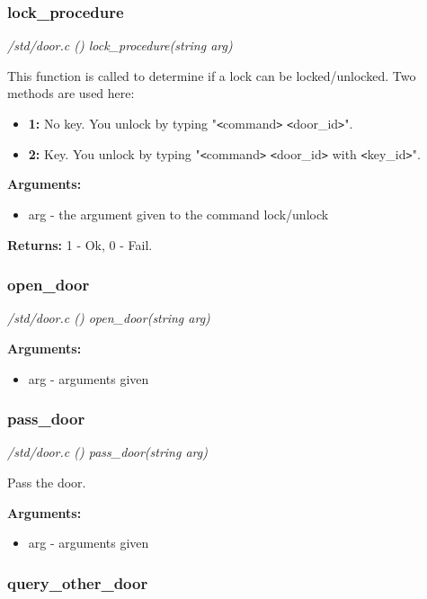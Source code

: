 \subsubsection{lock\_procedure}

{\em /std/door.c () lock\_procedure(string arg)}

This function is called to determine if
a lock can be locked/unlocked.
Two methods are used here:
\begin{itemize}
\item{\bf 1:} No key. You unlock by typing "\verb+<+command\verb+>+ \verb+<+door\_id\verb+>+".
\item{\bf 2:} Key. You unlock by typing "\verb+<+command\verb+>+ \verb+<+door\_id\verb+>+ with \verb+<+key\_id\verb+>+".
\end{itemize}

{\bf Arguments:}
\begin{itemize}
\item     arg - the argument given to the command lock/unlock
\end{itemize}

{\bf Returns:}        1 - Ok, 0 - Fail.


\subsubsection{open\_door}

{\em /std/door.c () open\_door(string arg)}


{\bf Arguments:}
\begin{itemize}
\item     arg - arguments given
\end{itemize}


\subsubsection{pass\_door}

{\em /std/door.c () pass\_door(string arg)}

Pass the door.

{\bf Arguments:}
\begin{itemize}
\item     arg - arguments given
\end{itemize}


\subsubsection{query\_other\_door}

